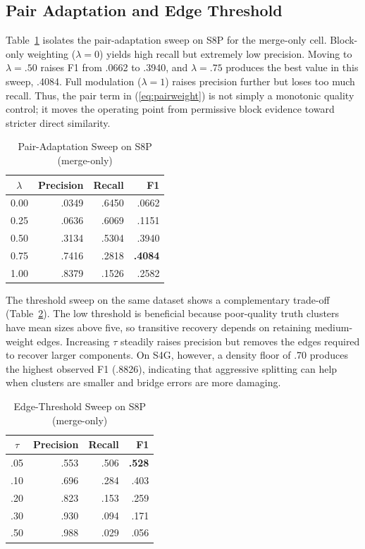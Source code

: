 \documentclass[conference]{IEEEtran}
\begin{document}
\subsection{Pair Adaptation and Edge Threshold}
Table~\ref{tab:lambda} isolates the pair-adaptation sweep on S8P for the merge-only cell. Block-only weighting ($\lambda=0$) yields high recall but extremely low precision. Moving to $\lambda=.50$ raises F1 from .0662 to .3940, and $\lambda=.75$ produces the best value in this sweep, .4084. Full modulation ($\lambda=1$) raises precision further but loses too much recall. Thus, the pair term in (\ref{eq:pairweight}) is not simply a monotonic quality control; it moves the operating point from permissive block evidence toward stricter direct similarity.

\begin{table}[t]
\caption{Pair-Adaptation Sweep on S8P (merge-only)}
\label{tab:lambda}
\centering
\scriptsize
\begin{tabular}{crrr}
\toprule
$\lambda$ & Precision & Recall & F1 \\
\midrule
0.00 & .0349 & .6450 & .0662 \\
0.25 & .0636 & .6069 & .1151 \\
0.50 & .3134 & .5304 & .3940 \\
0.75 & .7416 & .2818 & \textbf{.4084} \\
1.00 & .8379 & .1526 & .2582 \\
\bottomrule
\end{tabular}
\end{table}

The threshold sweep on the same dataset shows a complementary trade-off (Table~\ref{tab:tau}). The low threshold is beneficial because poor-quality truth clusters have mean sizes above five, so transitive recovery depends on retaining medium-weight edges. Increasing $\tau$ steadily raises precision but removes the edges required to recover larger components. On S4G, however, a density floor of .70 produces the highest observed F1 (.8826), indicating that aggressive splitting can help when clusters are smaller and bridge errors are more damaging.

\begin{table}[t]
\caption{Edge-Threshold Sweep on S8P (merge-only)}
\label{tab:tau}
\centering
\scriptsize
\begin{tabular}{crrr}
\toprule
$\tau$ & Precision & Recall & F1 \\
\midrule
.05 & .553 & .506 & \textbf{.528} \\
.10 & .696 & .284 & .403 \\
.20 & .823 & .153 & .259 \\
.30 & .930 & .094 & .171 \\
.50 & .988 & .029 & .056 \\
\bottomrule
\end{tabular}
\end{table}
\end{document}
